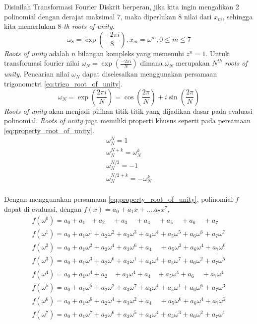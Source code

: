 Disinilah Transformasi Fourier Diskrit berperan, jika kita ingin mengalikan 2 polinomial dengan derajat maksimal 7, maka diperlukan 8 nilai dari $ x_m $, sehingga kita memerlukan 8\textit{-th roots of unity}.
$$ \omega_8 = \exp(\frac{-2\pi i}{8}) , x_m = \omega^m, 0 \leq m \leq 7 $$
\textit{Roots of unity} adalah $ n $ bilangan kompleks yang memenuhi $ z^{n} = 1 $. Untuk transformasi fourier nilai $ \omega_N = \exp(\frac{-2\pi i}{N}) $ dimana $ \omega_N $ merupakan $ N^{th} $ \textit{roots of unity}. Pencarian nilai $ \omega_N $ dapat diselesaikan menggunakan persamaan trigonometri \eqref{eq:trigo_root_of_unity}.
\begin{equation}
	\omega_N = \exp(\frac{2\pi i}{N}) = \cos(\frac{2\pi}{N}) + i \sin(\frac{2\pi}{N})
	\label{eq:trigo_root_of_unity}
\end{equation}
\textit{Roots of unity} akan menjadi pilihan titik-titik yang dijadikan dasar pada evaluasi polinomial. \textit{Roots of unity} juga memiliki properti khusus seperti pada persamaan \eqref{eq:property_root_of_unity}.
\begin{equation}
	\begin{aligned}
		\omega_{N}^{N} = 1 \\
		\omega_{N}^{N+k} = \omega_{N}^{k} \\
		\omega_{N}^{N/2} = -1 \\
		\omega_{N}^{N/2+k} = -\omega_{N}^{k} \\
	\end{aligned}
	\label{eq:property_root_of_unity}
\end{equation}

Dengan menggunakan persamaan \eqref{eq:property_root_of_unity}, polinomial $ f $ dapat di evaluasi, dengan $ f(x) = a_0 + a_1x + .... a_7x^7 $, 
\begin{equation}
	\begin{aligned}
		f(\omega^0) = a_0 + a_1 \ \ \   + a_2\ \ \ \ \ + a_3\ \ \ \ \ + a_4\ \ \ \ \ + a_5\ \ \ \ \ + a_6\ \ \ \ \ + a_7  \ \ \ \ \\ 
		f(\omega^1) = a_0 + a_1\omega^1 + a_2\omega^2 + a_3\omega^3 + a_4\omega^4 + a_5\omega^5 + a_6\omega^6 + a_7\omega^7 \\ 
		f(\omega^2) = a_0 + a_1\omega^2 + a_2\omega^4 + a_3\omega^6 + a_4\ \ \ \ \ + a_5\omega^2 + a_6\omega^4 + a_7\omega^6 \\ 
		f(\omega^3) = a_0 + a_1\omega^3 + a_2\omega^6 + a_3\omega^1 + a_4\omega^4 + a_5\omega^7 + a_6\omega^2 + a_7\omega^5 \\ 
		f(\omega^4) = a_0 + a_1\omega^4 + a_2\ \ \ \  + a_3\omega^4 + a_4\ \ \ \  + a_5\omega^4 + a_6\ \ \ \ \ + a_7\omega^4 \\ 
		f(\omega^5) = a_0 + a_1\omega^5 + a_2\omega^2 + a_3\omega^7 + a_4\omega^4 + a_5\omega^1 + a_6\omega^6 + a_7\omega^3 \\ 
		f(\omega^6) = a_0 + a_1\omega^6 + a_2\omega^4 + a_3\omega^2 + a_4\ \ \ \ \ + a_5\omega^6 + a_6\omega^4 + a_7\omega^2 \\ 
		f(\omega^7) = a_0 + a_1\omega^7 + a_2\omega^6 + a_3\omega^5 + a_4\omega^4 + a_5\omega^3 + a_6\omega^2 + a_7\omega^1 \\ 
	\end{aligned}
	\label{eq:evaluasi_fft}
\end{equation}

